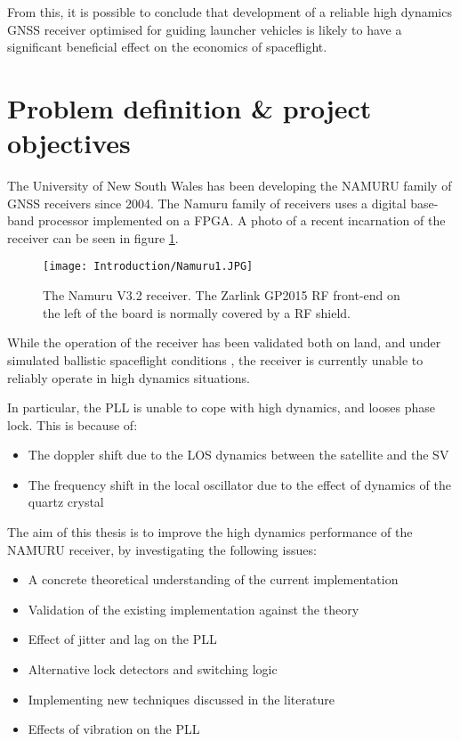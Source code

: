 From this, it is possible to conclude that development of a reliable high dynamics GNSS receiver optimised for guiding launcher vehicles is likely to have a significant beneficial effect on the economics of spaceflight.

\section{Problem definition \& project objectives}

The University of New South Wales has been developing the \ac{NAMURU} family of \ac{GNSS} receivers since 2004\cite{MumfordNamuru}. The Namuru family of receivers uses a digital base-band processor implemented on a \ac{FPGA}\cite{Glennon11aquariusfirmware}. A photo of a recent incarnation of the receiver can be seen in figure \ref{fig:Namuru1}.

\begin{figure}[!htb] 
    \centering
    \texttt{[image: Introduction/Namuru1.JPG]} 
    \caption{The Namuru V3.2 receiver. The Zarlink GP2015 \ac{RF} front-end on the left of the board is normally covered by a \ac{RF} shield.}
    \label{fig:Namuru1}
\end{figure}

While the operation of the receiver has been validated both on land, and under simulated ballistic spaceflight conditions \cite{NamuruSpaceflight1,NamuruSpaceflight2}, the receiver is currently unable to reliably operate in high dynamics situations. 

In particular, the \ac{PLL} is unable to cope with high dynamics, and looses phase lock. This is because of: 
\begin{itemize}
\item{The doppler shift due to the \ac{LOS} dynamics between the satellite and the \ac{SV}}
\item{The frequency shift in the local oscillator due to the effect of dynamics of the quartz crystal}
\end{itemize}

The aim of this thesis is to improve the high dynamics performance of the \ac{NAMURU} receiver, by investigating the following issues:  

\begin{itemize}
\item{A concrete theoretical understanding of the current implementation}
\item{Validation of the existing implementation against the theory}
\item{Effect of jitter and lag on the \ac{PLL}}
\item{Alternative lock detectors and switching logic}
\item{Implementing new techniques discussed in the literature}
\item{Effects of vibration on the \ac{PLL}}
\end{itemize}

